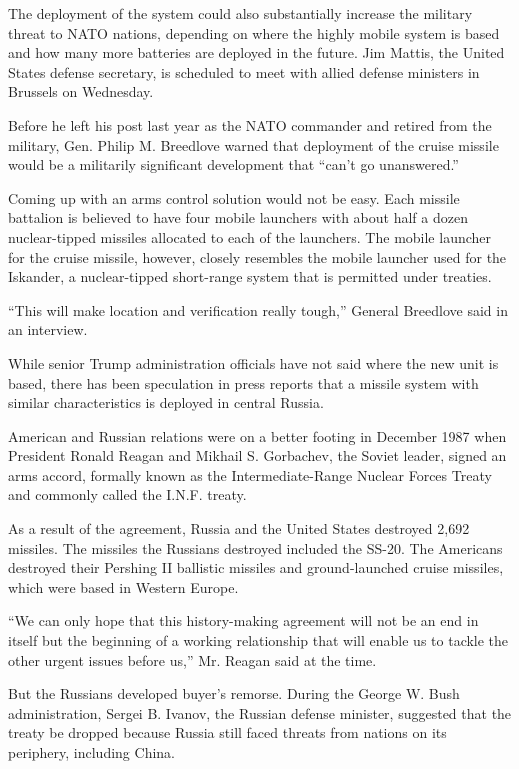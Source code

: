 The deployment of the system could also substantially increase the
military threat to NATO nations, depending on where the highly mobile
system is based and how many more batteries are deployed in the future.
Jim Mattis, the United States defense secretary, is scheduled to meet
with allied defense ministers in Brussels on Wednesday.

Before he left his post last year as the NATO commander and retired from
the military, Gen. Philip M. Breedlove warned that deployment of the
cruise missile would be a militarily significant development that
``can't go unanswered.''

Coming up with an arms control solution would not be easy. Each missile
battalion is believed to have four mobile launchers with about half a
dozen nuclear-tipped missiles allocated to each of the launchers. The
mobile launcher for the cruise missile, however, closely resembles the
mobile launcher used for the Iskander, a nuclear-tipped short-range
system that is permitted under treaties.

``This will make location and verification really tough,'' General
Breedlove said in an interview.

While senior Trump administration officials have not said where the new
unit is based, there has been speculation in press reports that a
missile system with similar characteristics is deployed in central
Russia.

American and Russian relations were on a better footing in December 1987
when President Ronald Reagan and Mikhail S. Gorbachev, the Soviet
leader, signed an arms accord, formally known as the Intermediate-Range
Nuclear Forces Treaty and commonly called the I.N.F. treaty.

As a result of the agreement, Russia and the United States destroyed
2,692 missiles. The missiles the Russians destroyed included the SS-20.
The Americans destroyed their Pershing II ballistic missiles and
ground-launched cruise missiles, which were based in Western Europe.

``We can only hope that this history-making agreement will not be an end
in itself but the beginning of a working relationship that will enable
us to tackle the other urgent issues before us,'' Mr. Reagan said at the
time.

But the Russians developed buyer's remorse. During the George W. Bush
administration, Sergei B. Ivanov, the Russian defense minister,
suggested that the treaty be dropped because Russia still faced threats
from nations on its periphery, including China.

